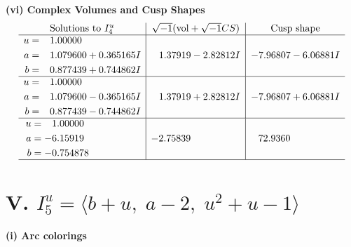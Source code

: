 \documentclass[1p]{elsarticle_modified}
\theoremstyle{definition}
\newcommand{\I}{\sqrt{-1}}
\begin{document}
\newpage\flushleft \textbf{(vi) Complex Volumes and Cusp Shapes}
$$\begin{array}{c|c|c}  
\text{Solutions to }I^u_{4}& \I (\text{vol} + \sqrt{-1}CS) & \text{Cusp shape}\\
 \hline 
\begin{aligned}
u &= \phantom{-}1.00000\phantom{ +0.000000I} \\
a &= \phantom{-}1.079600 + 0.365165 I \\
b &= \phantom{-}0.877439 + 0.744862 I\end{aligned}
 & \phantom{-}1.37919 - 2.82812 I & -7.96807 - 6.06881 I \\ \hline\begin{aligned}
u &= \phantom{-}1.00000\phantom{ +0.000000I} \\
a &= \phantom{-}1.079600 - 0.365165 I \\
b &= \phantom{-}0.877439 - 0.744862 I\end{aligned}
 & \phantom{-}1.37919 + 2.82812 I & -7.96807 + 6.06881 I \\ \hline\begin{aligned}
u &= \phantom{-}1.00000\phantom{ +0.000000I} \\
a &= -6.15919\phantom{ +0.000000I} \\
b &= -0.754878\phantom{ +0.000000I}\end{aligned}
 & -2.75839\phantom{ +0.000000I} & \phantom{-}72.9360\phantom{ +0.000000I}\\
 \hline 
 \end{array}$$\newpage\newpage\renewcommand{\arraystretch}{1}
\centering \section*{V. $I^u_{5}= \langle b+u,\;a-2,\;u^2+u-1 \rangle$}
\flushleft \textbf{(i) Arc colorings}\\
\end{document}
